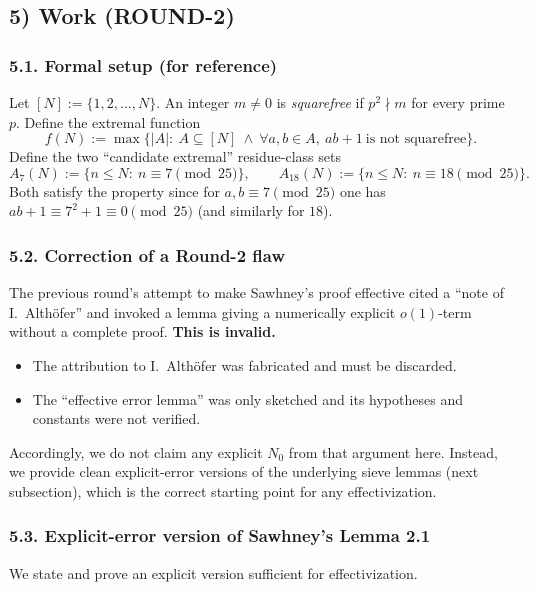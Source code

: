 \subsection*{5) Work (ROUND-2)}

\subsubsection*{5.1. Formal setup (for reference)}
Let $[N]:=\{1,2,\dots,N\}$.  An integer $m\neq 0$ is \emph{squarefree} if $p^2\nmid m$ for every prime $p$.
Define the extremal function
\[
f(N):=\max\bigl\{|A|:\ A\subseteq[N]\ \wedge\ \forall a,b\in A,\ ab+1\ \text{is not squarefree}\bigr\}.
\]
Define the two ``candidate extremal'' residue-class sets
\[
A_7(N):=\{n\le N:\ n\equiv 7\!\!\!\pmod{25}\},\qquad
A_{18}(N):=\{n\le N:\ n\equiv 18\!\!\!\pmod{25}\}.
\]
Both satisfy the property since for $a,b\equiv 7\!\pmod{25}$ one has $ab+1\equiv 7^2+1\equiv 0\pmod{25}$ (and similarly for $18$).

\subsubsection*{5.2. Correction of a Round-2 flaw}
The previous round's attempt to make Sawhney's proof effective cited a ``note of I.~Alth\"ofer'' and invoked a lemma giving a numerically explicit $o(1)$-term without a complete proof.
\textbf{This is invalid.}
\begin{itemize}
\item The attribution to I.~Alth\"ofer was fabricated and must be discarded.
\item The ``effective error lemma'' was only sketched and its hypotheses and constants were not verified.
\end{itemize}
Accordingly, we do not claim any explicit $N_0$ from that argument here.
Instead, we provide clean explicit-error versions of the underlying sieve lemmas (next subsection), which is the correct starting point for any effectivization.

\subsubsection*{5.3. Explicit-error version of Sawhney's Lemma 2.1}
We state and prove an explicit version sufficient for effectivization.

